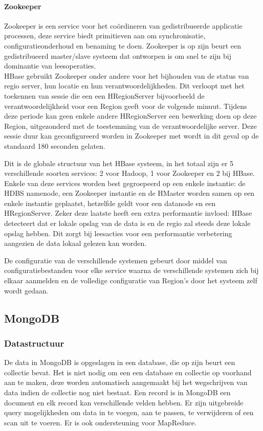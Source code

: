 \paragraph{Zookeeper\cite{hunt2010zookeeper}} Zookeeper is een service voor het coördineren van gedistribueerde applicatie processen, deze service biedt primitieven aan om synchronisatie, configuratieonderhoud en benaming te doen. Zookeeper is op zijn beurt een gedistribueerd master/slave systeem dat ontworpen is om snel te zijn bij dominantie van leesoperaties.  \\
HBase gebruikt Zookeeper onder andere voor het bijhouden van de status van regio server, hun locatie en hun verantwoordelijkheden. Dit verloopt met het toekennen van sessie die een een HRegionServer bijvoorbeeld de verantwoordelijkheid voor een Region geeft voor de volgende minuut. Tijdens deze periode kan geen enkele andere HRegionServer een bewerking doen op deze Region, uitgezonderd met de toestemming van de verantwoordelijke server. \cite{george2011hbase} Deze sessie duur kan geconfigureerd worden in Zookeeper met wordt in dit geval op de standaard 180 seconden gelaten. 

Dit is de globale structuur van het HBase systeem, in het totaal zijn er 5 verschillende soorten services: 2 voor Hadoop, 1 voor Zookeeper en 2 bij HBase. Enkele van deze services worden best gegroepeerd op een enkele instantie: de HDBS namenode, een Zookeeper instantie en de HMaster worden samen op een enkele instantie geplaatst, hetzelfde geldt voor een datanode en een HRegionServer. Zeker deze laatste heeft een extra performantie invloed: HBase detecteert dat er lokale opslag van de data is en de regio zal steeds deze lokale opslag hebben. Dit zorgt bij leesacties voor een performantie verbetering aangezien de data lokaal gelezen kan worden.

De configuratie van de verschillende systemen gebeurt door middel van configuratiebestanden voor elke service waarna de verschillende systemen zich bij elkaar aanmelden en de volledige configuratie van Region's door het systeem zelf wordt gedaan.  

\subsection{MongoDB\cite{mongodb-manual}}

\subsubsection{Datastructuur}
De data in MongoDB is opgeslagen in een database, die op zijn beurt een collectie bevat. Het is niet nodig om een een database en collectie op voorhand aan te maken, deze worden automatisch aangemaakt bij het wegschrijven van data indien de collectie nog niet bestaat. Een record is in MongoDB een document en elk record kan verschillende velden hebben. Er zijn uitgebreide query mogelijkheden om data in te voegen, aan te passen, te verwijderen of een scan uit te voeren. Er is ook ondersteuning voor MapReduce\cite{dean2008mapreduce}. 

